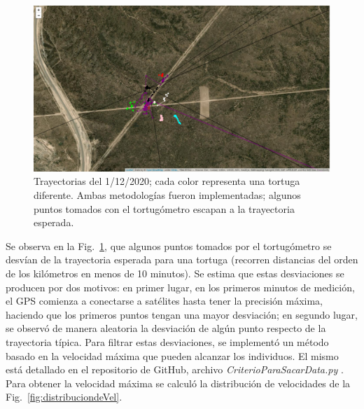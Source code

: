 \begin{figure}[ht]
    \begin{center}
       
   
    \includegraphics[width=\imsize]{Chap2/Traye1_12_sinF.png}
\end{center}
    \caption[Trayectorias un dia de medición, sin filtrar.]{Trayectorias del 1/12/2020; cada color representa una tortuga diferente. Ambas metodologías fueron implementadas; algunos puntos tomados con el tortugómetro escapan a la trayectoria esperada.}
    \label{fig:trayeSinFiltr}
\end{figure}
Se observa en la Fig.~\ref{fig:trayeSinFiltr}, que algunos puntos tomados por el tortugómetro se desvían de la trayectoria esperada para una tortuga (recorren distancias del orden de los kilómetros en menos de 10 minutos). Se estima que estas desviaciones se producen por dos motivos: en primer lugar, en los primeros minutos de medición, el GPS comienza a conectarse a satélites hasta tener la precisión máxima, haciendo que  los primeros puntos tengan una mayor desviación; en segundo lugar, se observó de manera aleatoria la desviación de algún punto respecto de la trayectoria típica. Para filtrar estas desviaciones, se implementó un método basado en la velocidad máxima que pueden alcanzar los individuos. El mismo está detallado en el repositorio de GitHub, archivo \textit{CriterioParaSacarData.py} \cite{github}. Para obtener la velocidad máxima se calculó la distribución de velocidades de la Fig.~\ref{fig:distribuciondeVel}.
 
